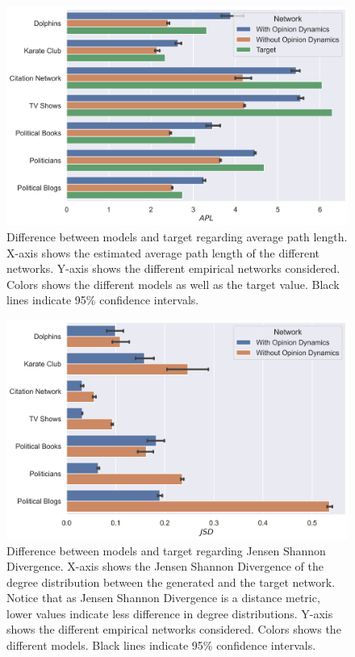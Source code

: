 \documentclass{article}
\begin{document}
\begin{figure}[H]
    \centering
    \includegraphics[width=.8\linewidth]{../plots/overall/Model_Evaluation_APL.png}
  \caption{Difference between models and target regarding average path length. X-axis shows the estimated average path length of the different networks. Y-axis shows the different empirical networks considered. Colors shows the different models as well as the target value. Black lines indicate 95\% confidence intervals.}
  \label{fig:eval_path}
\end{figure}

\begin{figure}[H]
    \centering
    \includegraphics[width=.8\linewidth]{../plots/overall/Model_Evaluation_JSD.png}
  \caption{Difference between models and target regarding Jensen Shannon Divergence. X-axis shows the Jensen Shannon Divergence of the degree distribution between the generated and the target network. Notice that as Jensen Shannon Divergence is a distance metric, lower values indicate less difference in degree distributions. Y-axis shows the different empirical networks considered. Colors shows the different models. Black lines indicate 95\% confidence intervals.}
  \label{fig:eval_divergence}
\end{figure}
\end{document}
